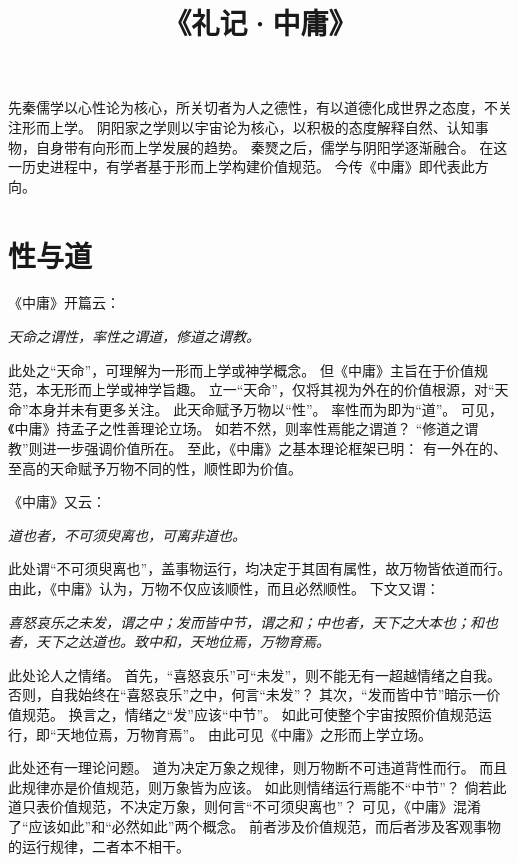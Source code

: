 \documentclass[11pt]{article}
\title{《礼记·中庸》}
\author{}
\date{}
\begin{document}
  \maketitle

  \linenumbers
先秦儒学以心性论为核心，所关切者为人之德性，有以道德化成世界之态度，不关注形而上学。
阴阳家之学则以宇宙论为核心，以积极的态度解释自然、认知事物，自身带有向形而上学发展的趋势。
秦燹之后，儒学与阴阳学逐渐融合。
在这一历史进程中，有学者基于形而上学构建价值规范。
今传《中庸》即代表此方向。

\section{性与道}
《中庸》开篇云：

\textit{天命之谓性，率性之谓道，修道之谓教。}

此处之“天命”，可理解为一形而上学或神学概念。
但《中庸》主旨在于价值规范，本无形而上学或神学旨趣。
立一“天命”，仅将其视为外在的价值根源，对“天命”本身并未有更多关注。
此天命赋予万物以“性”。
率性而为即为“道”。
可见，《中庸》持孟子之性善理论立场。
如若不然，则率性焉能之谓道？
“修道之谓教”则进一步强调价值所在。
至此，《中庸》之基本理论框架已明：
有一外在的、至高的天命赋予万物不同的性，顺性即为价值。

\newline

《中庸》又云：

\textit{道也者，不可须臾离也，可离非道也。}

此处谓“不可须臾离也”，盖事物运行，均决定于其固有属性，故万物皆依道而行。
由此，《中庸》认为，万物不仅应该顺性，而且必然顺性。
下文又谓：

\textit{喜怒哀乐之未发，谓之中；发而皆中节，谓之和；中也者，天下之大本也；和也者，天下之达道也。致中和，天地位焉，万物育焉。}

此处论人之情绪。
首先，“喜怒哀乐”可“未发”，则不能无有一超越情绪之自我。
否则，自我始终在“喜怒哀乐”之中，何言“未发”？
其次，“发而皆中节”暗示一价值规范。
换言之，情绪之“发”应该“中节”。
如此可使整个宇宙按照价值规范运行，即“天地位焉，万物育焉”。
由此可见《中庸》之形而上学立场。

\newline

此处还有一理论问题。
道为决定万象之规律，则万物断不可违道背性而行。
而且此规律亦是价值规范，则万象皆为应该。
如此则情绪运行焉能不“中节”？
倘若此道只表价值规范，不决定万象，则何言“不可须臾离也”？
可见，《中庸》混淆了“应该如此”和“必然如此”两个概念。
前者涉及价值规范，而后者涉及客观事物的运行规律，二者本不相干。
\end{document}
